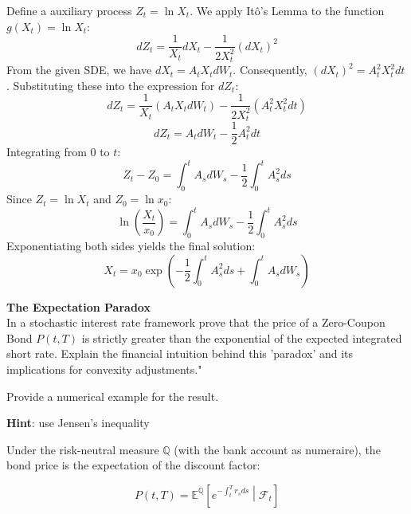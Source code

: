 \documentclass[12pt,a4paper]{exam}
\begin{document}
\begin{questions}
\begin{solution}
\vspace{1em}

Define a auxiliary process $Z_t = \ln X_t$. We apply Itô's Lemma to the function $g(X_t) = \ln X_t$:
\begin{equation*}
	dZ_t = \frac{1}{X_t} dX_t - \frac{1}{2 X_t^2} (dX_t)^2
\end{equation*}
From the given SDE, we have $dX_t = A_t X_t dW_t$. Consequently, $(dX_t)^2 = A_t^2 X_t^2 dt$. Substituting these into the expression for $dZ_t$:
\begin{equation*}
	dZ_t = \frac{1}{X_t} (A_t X_t dW_t) - \frac{1}{2 X_t^2} (A_t^2 X_t^2 dt)
\end{equation*}
\begin{equation*}
	dZ_t = A_t dW_t - \frac{1}{2} A_t^2 dt
\end{equation*}
Integrating from $0$ to $t$:
\begin{equation*}
	Z_t - Z_0 = \int_0^t A_s dW_s - \frac{1}{2} \int_0^t A_s^2 ds
\end{equation*}
Since $Z_t = \ln X_t$ and $Z_0 = \ln x_0$:
\begin{equation*}
	\ln \left( \frac{X_t}{x_0} \right) = \int_0^t A_s dW_s - \frac{1}{2} \int_0^t A_s^2 ds
\end{equation*}
Exponentiating both sides yields the final solution:
\begin{equation*}
	X_t = x_0 \exp \left( -\frac{1}{2} \int_0^t A_s^2 ds + \int_0^t A_s dW_s \right)
\end{equation*}
\end{solution}

\question \textbf{The Expectation Paradox} \\
In a stochastic interest rate framework prove that the price of a Zero-Coupon Bond $P(t,T)$ is strictly greater than the exponential of the expected integrated short rate.
Explain the financial intuition behind this 'paradox' and its implications for convexity adjustments."

Provide a numerical example for the result.

\textbf{Hint}: use Jensen's inequality

\begin{solution}
Under the risk-neutral measure $\mathbb{Q}$ (with the bank account as numeraire), the bond price is the expectation of the discount factor:

\begin{equation*}
	P(t,T) = \mathbb{E}^{\mathbb{Q}}\left[ e^{-\int_t^T r_s ds} \middle| \mathcal{F}_t \right]
\end{equation*}


\end{solution}
\end{questions}
\end{document}
